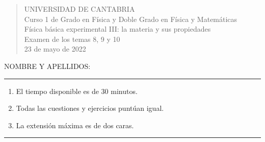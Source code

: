 \documentclass[11pt]{articulo}
\begin{document}
\begin{verse}
{\Large UNIVERSIDAD DE CANTABRIA}\\ 
\vspace*{0.5cm}
{\normalsize \rm Curso 1 de Grado en F\'isica y Doble Grado en F\'isica y Matem\'aticas}\\
{\normalsize \rm F\'isica b\'asica experimental III: la materia y sus propiedades}\\ 
{\normalsize \rm Examen de los temas 8, 9 y 10}\\
{\normalsize \rm 23 de mayo de 2022}\\
\end{verse} 

\vspace*{0.25cm}

NOMBRE Y APELLIDOS:\\

\vspace*{0.25cm}
 
\hrule
\begin{enumerate}
\item[] El tiempo disponible es de 30 minutos.
\item[] Todas las cuestiones y ejercicios punt\'uan igual.
\item[] La extensi\'on m\'axima es de dos caras.
\end{enumerate}
\hrule
          
\end{document}
